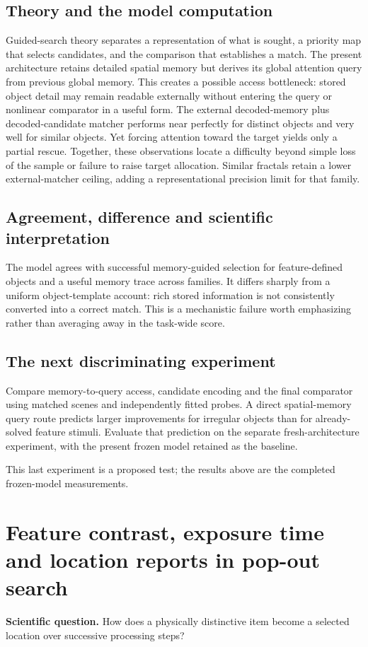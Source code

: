 \documentclass[11pt]{article}
\begin{document}
\subsection{Theory and the model computation}
Guided-search theory separates a representation of what is sought, a priority map that selects candidates, and the comparison that establishes a match. The present architecture retains detailed spatial memory but derives its global attention query from previous global memory. This creates a possible access bottleneck: stored object detail may remain readable externally without entering the query or nonlinear comparator in a useful form. The external decoded-memory plus decoded-candidate matcher performs near perfectly for distinct objects and very well for similar objects. Yet forcing attention toward the target yields only a partial rescue. Together, these observations locate a difficulty beyond simple loss of the sample or failure to raise target allocation. Similar fractals retain a lower external-matcher ceiling, adding a representational precision limit for that family. \cite{bio_wolfe}

\subsection{Agreement, difference and scientific interpretation}
The model agrees with successful memory-guided selection for feature-defined objects and a useful memory trace across families. It differs sharply from a uniform object-template account: rich stored information is not consistently converted into a correct match. This is a mechanistic failure worth emphasizing rather than averaging away in the task-wide score.

\subsection{The next discriminating experiment}
Compare memory-to-query access, candidate encoding and the final comparator using matched scenes and independently fitted probes. A direct spatial-memory query route predicts larger improvements for irregular objects than for already-solved feature stimuli. Evaluate that prediction on the separate fresh-architecture experiment, with the present frozen model retained as the baseline.

This last experiment is a proposed test; the results above are the completed frozen-model measurements.
\clearpage\section{Feature contrast, exposure time and location reports in pop-out search}
\textbf{Scientific question.} How does a physically distinctive item become a selected location over successive processing steps?
\end{document}
